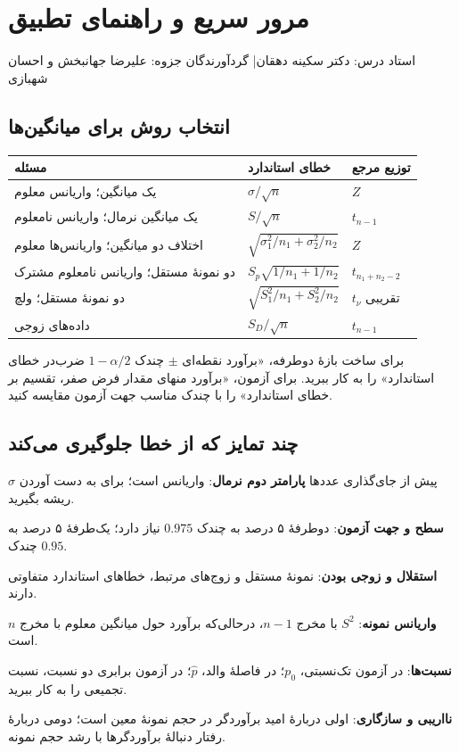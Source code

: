 \documentclass[12pt,a4paper,oneside]{report}
\newcounter{ex}[chapter]
\begin{document}
\appendix
\chapter{مرور سریع و راهنمای تطبیق}
\begin{center}{\small\color{muted} استاد درس: دکتر سکینه دهقان\quad | \quad گردآورندگان جزوه: علیرضا جهانبخش و احسان شهبازی}\end{center}

\begingroup\small\linespread{1.0}\selectfont
\section{انتخاب روش برای میانگین‌ها}
\begin{center}\small
\renewcommand{\arraystretch}{1.15}
\begin{tabular}{>{\raggedleft\arraybackslash}p{57mm} >{\centering\arraybackslash}p{59mm} >{\centering\arraybackslash}p{24mm}}
\toprule
مسئله & خطای استاندارد & توزیع مرجع\\
\midrule
یک میانگین؛ واریانس معلوم & $\sigma/\sqrt n$ & $Z$\\
یک میانگین نرمال؛ واریانس نامعلوم & $S/\sqrt n$ & $t_{n-1}$\\
اختلاف دو میانگین؛ واریانس‌ها معلوم & $\sqrt{\sigma_1^2/n_1+\sigma_2^2/n_2}$ & $Z$\\
دو نمونهٔ مستقل؛ واریانس نامعلوم مشترک & $S_p\sqrt{1/n_1+1/n_2}$ & $t_{n_1+n_2-2}$\\
دو نمونهٔ مستقل؛ ولچ & $\sqrt{S_1^2/n_1+S_2^2/n_2}$ & $t_\nu$ تقریبی\\
داده‌های زوجی & $S_D/\sqrt n$ & $t_{n-1}$\\
\bottomrule
\end{tabular}
\end{center}
برای ساخت بازهٔ دوطرفه، «برآورد نقطه‌ای $\pm$ چندک $1-\alpha/2$ ضرب‌در خطای استاندارد» را به کار ببرید. برای آزمون، «برآورد منهای مقدار فرض صفر، تقسیم بر خطای استاندارد» را با چندک مناسب جهت آزمون مقایسه کنید.
\section{چند تمایز که از خطا جلوگیری می‌کند}
\begin{important}{پیش از جای‌گذاری عددها}
\textbf{پارامتر دوم نرمال}: واریانس است؛ برای به دست آوردن $\sigma$ ریشه بگیرید.

\textbf{سطح و جهت آزمون}: دوطرفهٔ ۵ درصد به چندک $0.975$ نیاز دارد؛ یک‌طرفهٔ ۵ درصد به چندک $0.95$.

\textbf{استقلال و زوجی بودن}: نمونهٔ مستقل و زوج‌های مرتبط، خطاهای استاندارد متفاوتی دارند.

\textbf{واریانس نمونه}: $S^2$ با مخرج $n-1$، درحالی‌که برآورد حول میانگین معلوم با مخرج $n$ است.

\textbf{نسبت‌ها}: در آزمون تک‌نسبتی، $p_0$؛ در فاصلهٔ والد، $\widehat p$؛ در آزمون برابری دو نسبت، نسبت تجمیعی را به کار ببرید.

\textbf{نااریبی و سازگاری}: اولی دربارهٔ امید برآوردگر در حجم نمونهٔ معین است؛ دومی دربارهٔ رفتار دنبالهٔ برآوردگرها با رشد حجم نمونه.
\end{important}
\clearpage
\end{document}
